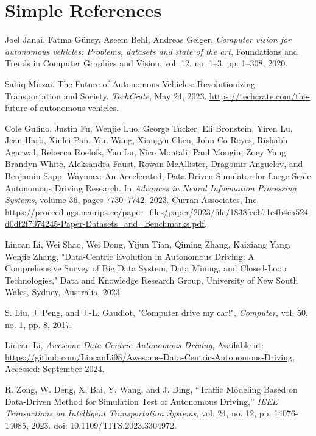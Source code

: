 \documentclass[lettersize,journal]{IEEEtran}
\begin{document}
\section{Simple References}

\begin{thebibliography}{1}

Joel Janai, Fatma G{\"u}ney, Aseem Behl, Andreas Geiger,
\textit{Computer vision for autonomous vehicles: Problems, datasets and state of the art},
Foundations and Trends{\textregistered} in Computer Graphics and Vision,
vol. 12, no. 1--3, pp. 1--308, 2020.

Sabiq Mirzai.
\newblock The Future of Autonomous Vehicles: Revolutionizing Transportation and Society.
\newblock \emph{TechCrate}, May 24, 2023.
\newblock \url{https://techcrate.com/the-future-of-autonomous-vehicles}.

Cole Gulino, Justin Fu, Wenjie Luo, George Tucker, Eli Bronstein, Yiren Lu, Jean Harb, Xinlei Pan, Yan Wang, Xiangyu Chen, John Co-Reyes, Rishabh Agarwal, Rebecca Roelofs, Yao Lu, Nico Montali, Paul Mougin, Zoey Yang, Brandyn White, Aleksandra Faust, Rowan McAllister, Dragomir Anguelov, and Benjamin Sapp.
\newblock Waymax: An Accelerated, Data-Driven Simulator for Large-Scale Autonomous Driving Research.
\newblock In \emph{Advances in Neural Information Processing Systems}, volume 36, pages 7730--7742, 2023.
\newblock Curran Associates, Inc.
\newblock \url{https://proceedings.neurips.cc/paper_files/paper/2023/file/1838feeb71c4b4ea524d0df2f7074245-Paper-Datasets_and_Benchmarks.pdf}.

Lincan Li, Wei Shao, Wei Dong, Yijun Tian, Qiming Zhang, Kaixiang Yang, Wenjie Zhang,
"Data-Centric Evolution in Autonomous Driving: A Comprehensive Survey of Big Data System, Data Mining, and Closed-Loop Technologies,"
Data and Knowledge Research Group, University of New South Wales, Sydney, Australia, 2023.

S. Liu, J. Peng, and J.-L. Gaudiot, "Computer drive my car!", \textit{Computer}, vol. 50, no. 1, pp. 8, 2017.

Lincan Li, \textit{Awesome Data-Centric Autonomous Driving}, Available at: \url{https://github.com/LincanLi98/Awesome-Data-Centric-Autonomous-Driving}, Accessed: September 2024.

R. Zong, W. Deng, X. Bai, Y. Wang, and J. Ding, ``Traffic Modeling Based on Data-Driven Method for Simulation Test of Autonomous Driving,'' \textit{IEEE Transactions on Intelligent Transportation Systems}, vol. 24, no. 12, pp. 14076-14085, 2023. doi: 10.1109/TITS.2023.3304972.


\end{thebibliography}
\end{document}
